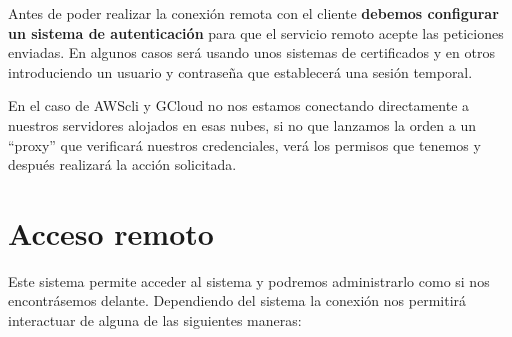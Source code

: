 Antes de poder realizar la conexión remota con el cliente \textbf{debemos configurar un sistema de autenticación} para que el servicio remoto acepte las peticiones enviadas. En algunos casos será usando unos sistemas de certificados y en otros introduciendo un usuario y contraseña que establecerá una sesión temporal.

En el caso de AWScli y GCloud no nos estamos conectando directamente a nuestros servidores alojados en esas nubes, si no que lanzamos la orden a un “proxy” que verificará nuestros credenciales, verá los permisos que tenemos y después realizará la acción solicitada.


%
%
%
%
%
%


\section{Acceso remoto}
Este sistema permite acceder al sistema y podremos administrarlo como si nos encontrásemos delante. Dependiendo del sistema la conexión nos permitirá interactuar de alguna de las siguientes maneras:

